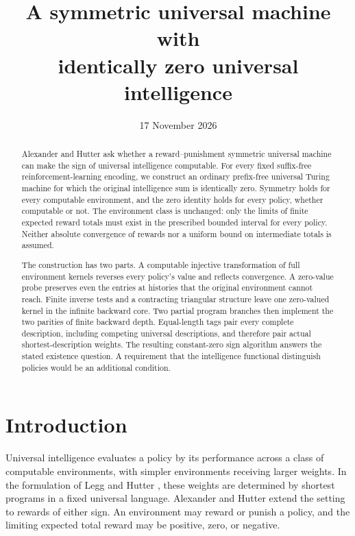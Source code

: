 \documentclass[11pt]{article}
\title{A symmetric universal machine with\texorpdfstring{\\}{ }identically zero universal intelligence}
\author{}
\date{17 November 2026}
\theoremstyle{definition}
\theoremstyle{remark}
\begin{document}
\maketitle

\begin{abstract}
Alexander and Hutter ask whether a reward--punishment symmetric universal
machine can make the sign of universal intelligence computable.  For every
fixed suffix-free reinforcement-learning encoding, we construct an ordinary
prefix-free universal Turing machine for which the original intelligence
sum is identically zero.  Symmetry holds for every computable environment,
and the zero identity holds for every policy, whether computable or not.
The environment class is unchanged: only the limits of finite expected
reward totals must exist in the prescribed bounded interval for every
policy.  Neither absolute convergence of rewards nor a uniform bound on
intermediate totals is assumed.

The construction has two parts.  A computable injective transformation of
full environment kernels reverses every policy's value and reflects
convergence.  A zero-value probe preserves even the entries at histories
that the original environment cannot reach.  Finite inverse tests and a
contracting triangular structure leave one zero-valued kernel in the
infinite backward core.  Two partial program branches then implement the
two parities of finite backward depth.  Equal-length tags pair every
complete description, including competing universal descriptions, and
therefore pair actual shortest-description weights.  The resulting
constant-zero sign algorithm answers the stated existence question.  A
requirement that the intelligence functional distinguish policies would
be an additional condition.
\end{abstract}

\section{Introduction}
\label{sec:introduction}

Universal intelligence evaluates a policy by its performance across a
class of computable environments, with simpler environments receiving
larger weights.  In the formulation of Legg and Hutter
\cite{LeggHutter2007}, these weights are determined by shortest programs
in a fixed universal language.  Alexander and Hutter
\cite{AlexanderHutter2021} extend the setting to rewards of either sign.
An environment may reward or punish a policy, and the limiting expected
total reward may be positive, zero, or negative.
\end{document}
